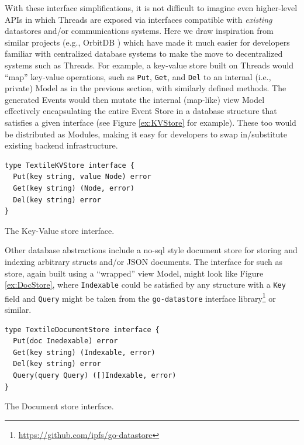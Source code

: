 \documentclass{textile}
\begin{document}
With these interface simplifications, it is not difficult to imagine even higher-level APIs in which Threads are exposed via interfaces compatible with \emph{existing} datastores and/or communications systems. Here we draw inspiration from similar projects (e.g., OrbitDB \cite{markroberthendersonOrbitDBFieldManual2019}) which have made it much easier for developers familiar with centralized database systems to make the move to decentralized systems such as Threads. For example, a key-value store built on Threads would ``map'' key-value operations, such as \texttt{Put}, \texttt{Get}, and \texttt{Del} to an internal (i.e., private) Model as in the previous section, with similarly defined methods. The generated Events would then mutate the internal (map-like) view Model effectively encapsulating the entire Event Store in a database structure that satisfies a given interface (see Figure \ref{ex:KVStore} for example). These too would be distributed as Modules, making it easy for developers to swap in/substitute existing backend infrastructure.

\begin{example}
  \begin{minipage}{.45\textwidth}
    \begin{lstlisting}
type TextileKVStore interface {
  Put(key string, value Node) error
  Get(key string) (Node, error)
  Del(key string) error
}
    \end{lstlisting}
  \end{minipage}
\caption{The Key-Value store interface.}
 \label{ex:KVStore}
\end{example}

Other database abstractions include a no-sql style document store for storing and indexing arbitrary structs and/or JSON documents. The interface for such as store, again built using a ``wrapped'' view Model, might look like Figure \ref{ex:DocStore}, where \texttt{Indexable} could be satisfied by any structure with a \texttt{Key} field and \texttt{Query} might be taken from the \texttt{go-datastore} interface library\footnote{\url{https://github.com/ipfs/go-datastore}} or similar.

\begin{example}
  \begin{minipage}{.45\textwidth}
    \begin{lstlisting}
type TextileDocumentStore interface {
  Put(doc Inedexable) error
  Get(key string) (Indexable, error)
  Del(key string) error
  Query(query Query) ([]Indexable, error)
}
    \end{lstlisting}
  \end{minipage}
\caption{The Document store interface.}
\label{ex:DocStore}
\end{example} 
\end{document}
